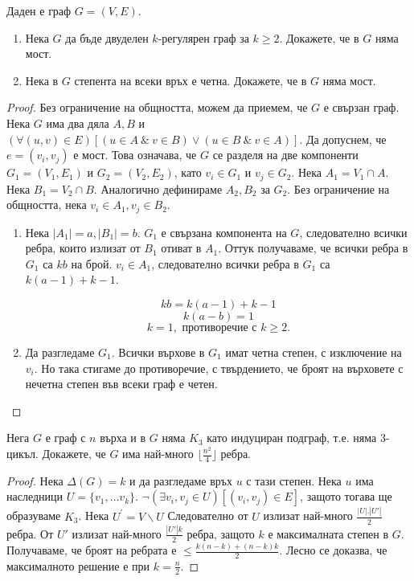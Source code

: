 \begin{problem}
  Даден е граф $G=(V,E)$. 
  \begin{enumerate}
  \item
    Нека $G$ да бъде двуделен $k$-регулярен граф за $k\geq 2$.
    Докажете, че в $G$ няма мост.
  \item
    Нека в $G$ степента на всеки връх е четна.
    Докажете, че в $G$ няма мост.
\end{enumerate}
\end{problem}
\begin{proof}
  Без ограничение на общността, можем да приемем, че $G$ е свързан граф.
  Нека $G$ има два дяла $A,B$ и $(\forall(u,v)\in E)[(u\in A\ \&\ v\in B)\vee(u\in B\ \&\ v\in A)].$
  Да допуснем, че $e=(v_i,v_j)$ е мост.
  Това означава, че $G$ се разделя на две компоненти $G_1=(V_1,E_1)$ и $G_2=(V_2,E_2)$, като $v_i\in G_1$ и $v_j\in G_2$.
  Нека $A_1 = V_1\cap A$.
  Нека $B_1 = V_2\cap B$.
  Аналогично дефинираме $A_2, B_2$ за $G_2$.
  Без ограничение на общността, нека $v_i\in A_1, v_j\in B_2$.
  \begin{enumerate}
  \item
    Нека $|A_1| = a, |B_1| = b$.
    $G_1$ е свързана компонента на $G$, следователно всички ребра, които излизат от $B_1$ отиват в $A_1$.
    Оттук получаваме, че всички ребра в $G_1$ са $kb$ на брой.
    $v_i\in A_1$, следователно всички ребра в $G_1$ са $k(a-1) + k - 1$.
    
    \[kb = k(a-1) + k-1\]
    \[k(a-b)=1\]
    \[k=1, \mbox{ противоречие с } k\geq 2.\]
  \item
    Да разгледаме $G_1$. Всички върхове в $G_1$ имат четна степен, с изключение на $v_i$.
    Но така стигаме до противоречие, с твърдението, че броят на върховете с нечетна степен във всеки граф е четен.
\end{enumerate}
\end{proof}


\begin{problem}
  Нега $G$ е граф с $n$ върха и в $G$ няма $K_3$ като индуциран подграф, т.е. няма 3-цикъл.
  Докажете, че $G$ има най-много $\lfloor{\frac{n^2}{4}}\rfloor$ ребра.
\end{problem}
\begin{proof}
  Нека $\Delta(G) = k$ и да разгледаме връх $u$ с тази степен.
  Нека $u$ има наследници $U = \{v_1,\dots v_k\}$.
  $\neg (\exists v_i, v_j\in U)[(v_i,v_j)\in E]$, защото тогава ще образуваме $K_3$.
  Нека $U^\prime = V\backslash U$
  Следователно от $U$ излизат най-много $\frac{|U|.|U'|}{2}$ ребра.
  От $U'$ излизат най-много $\frac{|U'|k}{2}$ ребра, защото $k$ е максималната степен в $G$.
  Получаваме, че броят на ребрата е $\leq \frac{k(n-k) + (n-k)k}{2}$.
  Лесно се доказва, че максималното решение е при $k = \frac{n}{2}$.
\end{proof}


